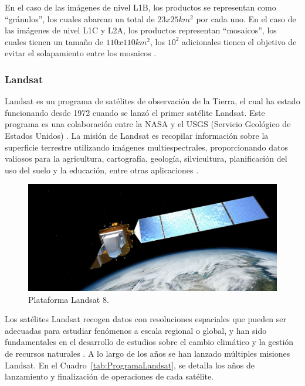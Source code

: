 En el caso de las imágenes de nivel L1B, los productos se representan como ``gránulos'', los cuales abarcan un total de $23x25 km^2$ por cada uno. En el caso de las imágenes de nivel L1C y L2A, los productos representan ``mosaicos'', los cuales tienen un tamaño de $110x110 km^2$, los $10^2$ adicionales tienen el objetivo de evitar el solapamiento entre los mosaicos \cite{sentinel2}.

\subsubsection{Landsat}

Landsat es un programa de satélites de observación de la Tierra, el cual ha estado funcionando desde 1972 cuando se lanzó el primer satélite Landsat. Este programa es una colaboración entre la NASA y el USGS (Servicio Geológico de Estados Unidos)  . La misión de Landsat es recopilar información sobre la superficie terrestre utilizando imágenes multiespectrales, proporcionando datos valiosos para la agricultura, cartografía, geología, silvicultura, planificación del uso del suelo y la educación, entre otras aplicaciones \cite{williams2006landsat}.


\begin{figure}[H]
    \begin{center}
        \includegraphics[width=1\textwidth]{Images/Landsat8.png}
    \end{center}
    \caption{Plataforma Landsat 8.}
    \label{fig:Landsat8}
\end{figure}

Los satélites Landsat recogen datos con resoluciones espaciales que pueden ser adecuadas para estudiar fenómenos a escala regional o global, y han sido fundamentales en el desarrollo de estudios sobre el cambio climático y la gestión de recursos naturales \cite{young2017land}. A lo largo de los años se han lanzado múltiples misiones Landsat. En el Cuadro~\ref{tab:ProgramaLandsat}, se detalla los años de lanzamiento y finalización de operaciones de cada satélite.

